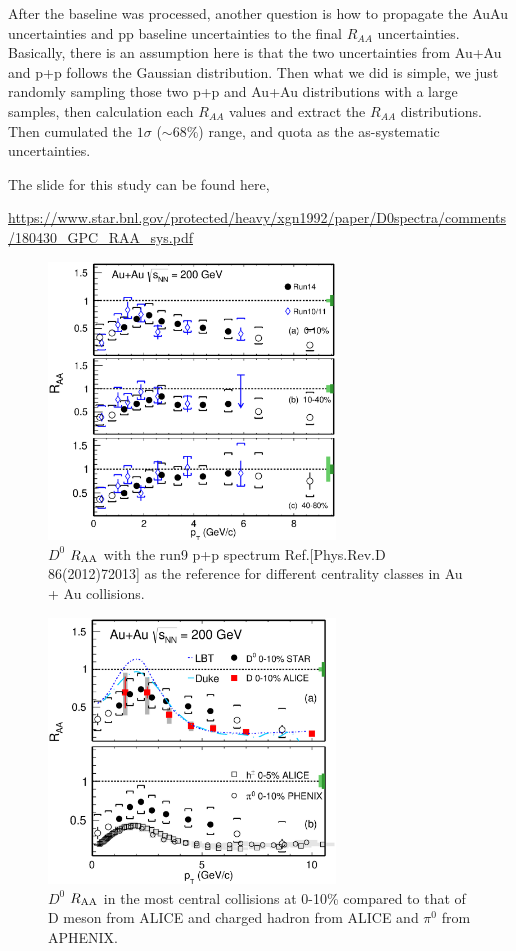 After the baseline was processed, another question is how to propagate the AuAu uncertainties and pp baseline uncertainties to the final $R_{AA}$ uncertainties. Basically, there is an assumption here is that the two uncertainties from Au+Au and p+p follows the Gaussian distribution. Then what we did is simple, we just randomly sampling those two p+p and Au+Au distributions with a large samples, then calculation each $R_{AA}$ values and extract the $R_{AA}$ distributions. Then cumulated the $1\sigma$ ($\sim68\%$) range, and quota as the as-systematic uncertainties.

The slide for this study can be found here, 

\url{https://www.star.bnl.gov/protected/heavy/xgn1992/paper/D0spectra/comments/180430_GPC_RAA_sys.pdf}

\begin{figure}
\centering
\includegraphics[width=0.68\textwidth]{figure/Run14_D0HFT/D0_RAA.eps}
\caption{$D^{0}$ $R_{\rm AA}$ with the run9 p+p spectrum Ref.[Phys.Rev.D 86(2012)72013] as the reference for different centrality classes in Au + Au collisions.}
\label{D0_RAA} 
\end{figure}

\begin{figure}
\centering
\includegraphics[width=0.68\textwidth]{figure/Run14_D0HFT/D0_RAA_LHC.eps}
\caption{$D^{0}$ $R_{\rm AA}$ in the most central collisions at 0-10\% compared to that of D meson from ALICE and charged hadron from ALICE and $\pi^0$ from APHENIX.}
\label{D0_RAA_LHC} 
\end{figure}

